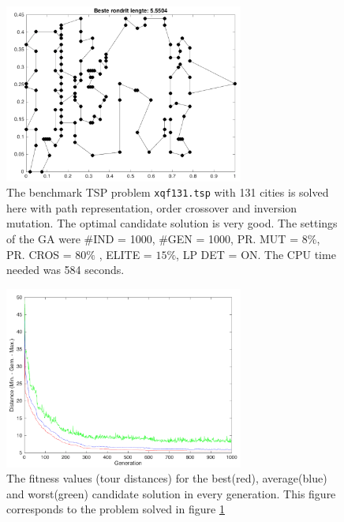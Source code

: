 \begin{figure}[!]
  \centering
    \includegraphics[width=0.7\textwidth]{../figures/figures_question_4/benchmark_131_path}
      \caption{The benchmark TSP problem \texttt{xqf131.tsp} with 131 cities is solved here with path representation, order crossover and inversion mutation. The optimal candidate solution is very good. The settings of the GA were \#IND = 1000, \#GEN = 1000, PR. MUT = $8\%$, PR. CROS = $80\%$ , ELITE = $15\%$, LP DET = ON. The CPU time needed was 584 seconds.}
      \label{fig:benchmark_131_path}
\end{figure}

\begin{figure}[!]
  \centering
    \includegraphics[width=0.7\textwidth]{../figures/figures_question_4/benchmark_131_gen}
      \caption{The fitness values (tour distances) for the best(red), average(blue) and worst(green) candidate solution in every generation. This figure corresponds to the problem solved in figure \ref{fig:benchmark_131_path}}
      \label{fig:benchmark_131_gen}
\end{figure}



\FloatBarrier